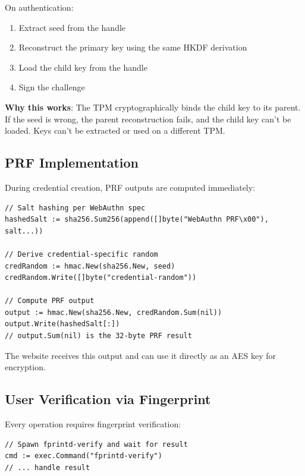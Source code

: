\documentclass{article}
\begin{document}
On authentication:

\begin{enumerate}
\item Extract seed from the handle

\item Reconstruct the primary key using the same HKDF derivation

\item Load the child key from the handle

\item Sign the challenge

\end{enumerate}

\textbf{Why this works}: The TPM cryptographically binds the child key to its parent. If the seed is wrong, the parent reconstruction fails, and the child key can't be loaded. Keys can't be extracted or used on a different TPM.

\subsection{PRF Implementation}

During credential creation, PRF outputs are computed immediately:

\begin{verbatim}
// Salt hashing per WebAuthn spec
hashedSalt := sha256.Sum256(append([]byte("WebAuthn PRF\x00"), salt...))

// Derive credential-specific random
credRandom := hmac.New(sha256.New, seed)
credRandom.Write([]byte("credential-random"))

// Compute PRF output
output := hmac.New(sha256.New, credRandom.Sum(nil))
output.Write(hashedSalt[:])
// output.Sum(nil) is the 32-byte PRF result
\end{verbatim}

The website receives this output and can use it directly as an AES key for encryption.

\subsection{User Verification via Fingerprint}

Every operation requires fingerprint verification:

\begin{verbatim}
// Spawn fprintd-verify and wait for result
cmd := exec.Command("fprintd-verify")
// ... handle result
\end{verbatim}
\end{document}
